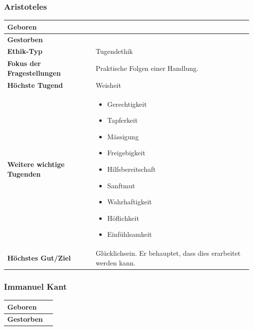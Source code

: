 		\subsubsection{Aristoteles}
			\begin{longtable}{>{\bfseries}p{}p{}}
				\hline
				Geboren
					& \\
				\hline
				Gestorben
					& \\
				\hline
				Ethik-Typ
					& Tugendethik\\
				\hline
				Fokus der Fragestellungen
					& Praktische Folgen einer Handlung.\\
				\hline
				Höchste Tugend
					& Weisheit\\
				\hline
				Weitere wichtige Tugenden
					&	
					\begin{itemize}
						\item Gerechtigkeit
						\item Tapferkeit
						\item Mässigung
						\item Freigebigkeit
						\item Hilfsbereitschaft
						\item Sanftmut
						\item Wahrhaftigkeit
						\item Höflichkeit
						\item Einfühlsamkeit
					\end{itemize}\\
				\hline
				Höchstes Gut/Ziel
					& Glücklichsein. Er behauptet, dass dies erarbeitet werden kann.\\
				\hline
			\end{longtable}	
		
		\subsubsection{Immanuel Kant}
			\begin{longtable}{>{\bfseries}p{}p{}}
				\hline
				Geboren
					& \\
				\hline
				Gestorben
					& \\
				\hline
			\end{longtable}	


